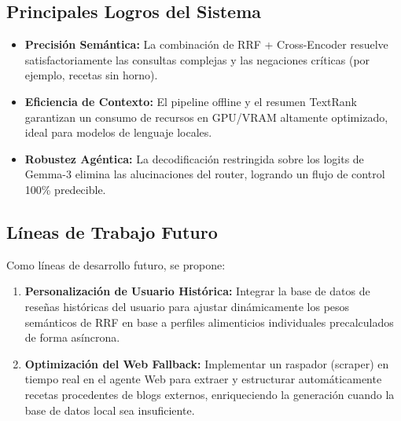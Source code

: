 \documentclass[11pt,a4paper]{article}
\begin{document}
\subsection{Principales Logros del Sistema}
\begin{itemize}
    \item \textbf{Precisión Semántica:} La combinación de RRF + Cross-Encoder resuelve satisfactoriamente las consultas complejas y las negaciones críticas (por ejemplo, recetas sin horno).
    \item \textbf{Eficiencia de Contexto:} El pipeline offline y el resumen TextRank garantizan un consumo de recursos en GPU/VRAM altamente optimizado, ideal para modelos de lenguaje locales.
    \item \textbf{Robustez Agéntica:} La decodificación restringida sobre los logits de Gemma-3 elimina las alucinaciones del router, logrando un flujo de control 100\% predecible.
\end{itemize}

\subsection{Líneas de Trabajo Futuro}
Como líneas de desarrollo futuro, se propone:
\begin{enumerate}
    \item \textbf{Personalización de Usuario Histórica:} Integrar la base de datos de reseñas históricas del usuario para ajustar dinámicamente los pesos semánticos de RRF en base a perfiles alimenticios individuales precalculados de forma asíncrona.
    \item \textbf{Optimización del Web Fallback:} Implementar un raspador (scraper) en tiempo real en el agente Web para extraer y estructurar automáticamente recetas procedentes de blogs externos, enriqueciendo la generación cuando la base de datos local sea insuficiente.
\end{enumerate}
\end{document}
